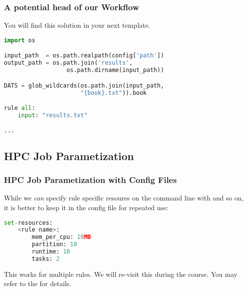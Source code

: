 \begin{frame}[fragile]
  \frametitle{A potential head of our Workflow}
  You will find this solution in your next template.
  \begin{lstlisting}[language=Python,style=Python, basicstyle=\small]
import os

input_path  = os.path.realpath(config['path'])
output_path = os.path.join('results', 
                  os.path.dirname(input_path))

DATS = glob_wildcards(os.path.join(input_path, 
                      "{book}.txt")).book

rule all:
    input: "results.txt"

...
  \end{lstlisting}
\end{frame}

\subsection{HPC Job Parametization}

\begin{frame}[fragile]
  \frametitle{HPC Job Parametization with Config Files}
  While we \emph{can} specify rule specific resoures on the command line with  and so on, it is better to keep it in the config file for repeated use:
  \begin{lstlisting}[language=Python,style=Python]
set-resources:
    <rule name>:
        mem_per_cpu: 10MB
        partition: 10
        runtime: 10
        tasks: 2
  \end{lstlisting}
  \begin{docs}
  	This works for multiple rules. We will re-visit this during the course. You may refer to the  for details.
  \end{docs}
\end{frame}

